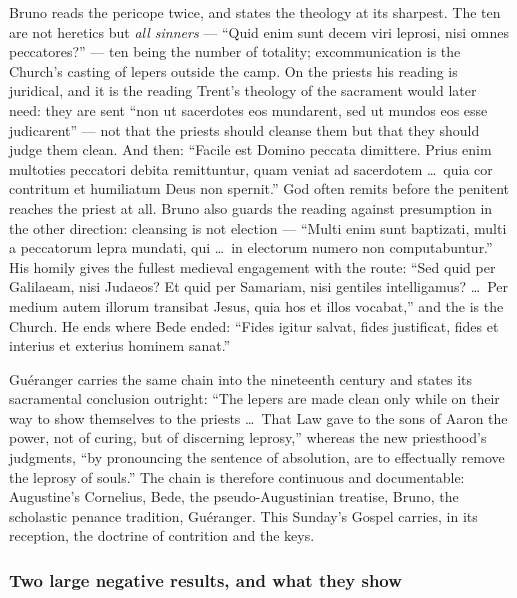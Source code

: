 \begin{witnessnote}
Bruno reads the pericope twice, and states the  theology at its
sharpest. The ten are not heretics but \textit{all sinners} --- ``Quid enim sunt
decem viri leprosi, nisi omnes peccatores?'' --- ten being the number of
totality; excommunication is the Church's casting of lepers outside the camp.
On the priests his reading is juridical, and it is the reading Trent's
theology of the sacrament would later need: they are sent ``non ut sacerdotes
eos mundarent, sed ut mundos eos esse judicarent'' --- not that the priests
should cleanse them but that they should judge them clean. And then: ``Facile
est Domino peccata dimittere. Prius enim multoties peccatori debita remittuntur,
quam veniat ad sacerdotem \dots\ quia cor contritum et humiliatum Deus non
spernit.'' God often remits before the penitent reaches the priest at all.
Bruno also guards the reading against presumption in the other direction:
cleansing is not election --- ``Multi enim sunt baptizati, multi a peccatorum
lepra mundati, qui \dots\ in electorum numero non computabuntur.'' His homily
gives the fullest medieval engagement with the route: ``Sed quid per
Galilaeam, nisi Judaeos? Et quid per Samariam, nisi gentiles intelligamus?
\dots\ Per medium autem illorum transibat Jesus, quia hos et illos vocabat,''
and the  is the Church. He ends where Bede ended: ``Fides
igitur salvat, fides justificat, fides et interius et exterius hominem sanat.''
\end{witnessnote}

Guéranger carries the same chain into the nineteenth century and states its
sacramental conclusion outright: ``The lepers are made clean only while on
their way to show themselves to the priests \dots\ That Law gave to the sons of
Aaron the power, not of curing, but of discerning leprosy,'' whereas the new
priesthood's judgments, ``by pronouncing the sentence of absolution, are to
effectually remove the leprosy of souls.'' The chain is therefore continuous
and documentable: Augustine's Cornelius, Bede, the pseudo-Augustinian treatise,
Bruno, the scholastic penance tradition, Guéranger. This Sunday's Gospel
carries, in its reception, the doctrine of contrition and the keys.

\subsubsection*{Two large negative results, and what they show}


